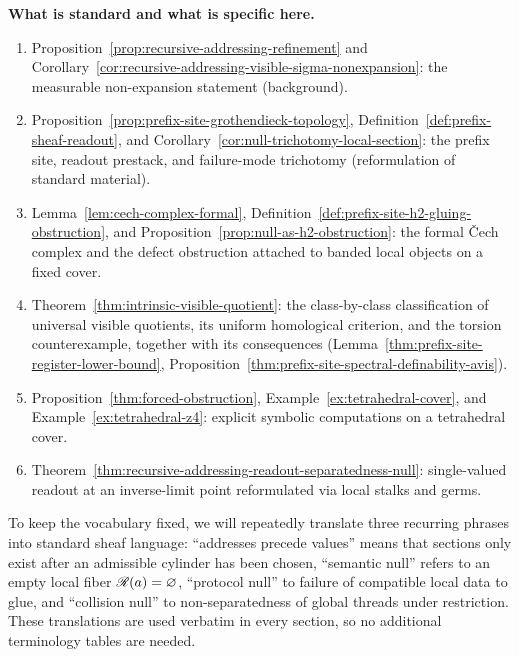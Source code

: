 \medskip
\noindent\textbf{What is standard and what is specific here.}
\begin{enumerate}[label=\textup{(\arabic*)}]
\item Proposition~\ref{prop:recursive-addressing-refinement} and
Corollary~\ref{cor:recursive-addressing-visible-sigma-nonexpansion}: the
measurable non-expansion statement (background).
\item Proposition~\ref{prop:prefix-site-grothendieck-topology},
Definition~\ref{def:prefix-sheaf-readout}, and
Corollary~\ref{cor:null-trichotomy-local-section}: the prefix site,
readout prestack, and failure-mode trichotomy (reformulation of standard
material).
\item Lemma~\ref{lem:cech-complex-formal},
Definition~\ref{def:prefix-site-h2-gluing-obstruction}, and
Proposition~\ref{prop:null-as-h2-obstruction}: the formal \v{C}ech complex and
the defect obstruction attached to banded local objects on a fixed cover.
\item Theorem~\ref{thm:intrinsic-visible-quotient}: the class-by-class
classification of universal visible quotients, its uniform homological
criterion, and the torsion counterexample, together with its consequences
(Lemma~\ref{thm:prefix-site-register-lower-bound},
Proposition~\ref{thm:prefix-site-spectral-definability-avis}).
\item Proposition~\ref{thm:forced-obstruction},
Example~\ref{ex:tetrahedral-cover}, and
Example~\ref{ex:tetrahedral-z4}: explicit symbolic computations on a
tetrahedral cover.
\item Theorem~\ref{thm:recursive-addressing-readout-separatedness-null}:
single-valued readout at an inverse-limit point reformulated via local stalks
and germs.
\end{enumerate}

To keep the vocabulary fixed, we will repeatedly translate three recurring
phrases into standard sheaf language: ``addresses precede values'' means that
sections only exist after an admissible cylinder has been chosen, ``semantic
null'' refers to an empty local fiber $\mathscr{R}(a)=\varnothing$, ``protocol
null'' to failure of compatible local data to glue, and ``collision null'' to
non-separatedness of global threads under restriction.  These translations are
used verbatim in every section, so no additional terminology tables are needed.

